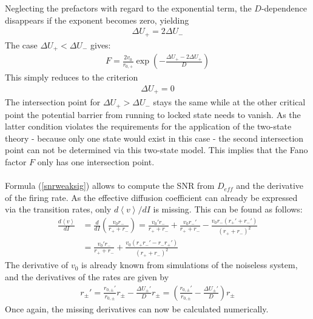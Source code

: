 \documentclass[12pt,a4paper]{article}
\begin{document}
Neglecting the prefactors with regard to the exponential term, the $D$-dependence disappears if the exponent becomes zero, yielding 
\begin{align*}
\Delta U_+=2\Delta U_-
\end{align*}
The case $\Delta U_+ < \Delta U_-$ gives:
\begin{align*}
F=\frac{2v_0}{r_{0,+}}\exp\left(-\frac{\Delta U_+-2\Delta U_+}{D}\right)
\end{align*}
This simply reduces to the criterion
\begin{align*}
\Delta U_+=0
\end{align*}
The intersection point for $\Delta U_+ > \Delta U_-$ stays the same while at the other critical point the potential barrier from running to locked state needs to vanish. As the latter condition violates the requirements for the application of the two-state theory - because only one state would exist in this case - the second intersection point can not be determined via this two-state model. This implies that the Fano factor $F$ only has one intersection point.\\\\
Formula (\ref{snrweaksig}) allows to compute the SNR from $D_{eff}$ and the derivative of the firing rate. As the effective diffusion coefficient can already be expressed via the transition rates, only $d\left<v\right>/dI$ is missing. This can be found as follows:
\begin{align*}
\frac{d\left<v\right>}{dI}&=\frac{d}{dI}\left(\frac{v_0r_-}{r_++r_-}\right)=\frac{v_0'r_-}{r_++r_-}+\frac{v_0r_-'}{r_++r_-}-\frac{v_0r_-(r_+'+r_-')}{(r_++r_-)^2}\\
&=\frac{v_0'r_-}{r_++r_-}+\frac{v_0(r_+r_-'-r_-r_+')}{(r_++r_-)^2}
\end{align*}
The derivative of $v_0$ is already known from simulations of the noiseless system, and the derivatives of the rates are given by
\begin{align*}
r_\pm'=\frac{r_{0,\pm}'}{r_{0,\pm}}r_\pm-\frac{\Delta U_\pm'}{D}r_\pm=\left(\frac{r_{0,\pm}'}{r_{0,\pm}}-\frac{\Delta U_\pm'}{D}\right)r_\pm
\end{align*}
Once again, the missing derivatives can now be calculated numerically.
\end{document}
